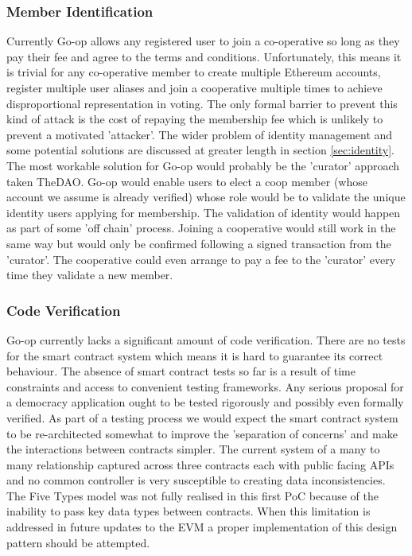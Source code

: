 \subsubsection{Member Identification}
Currently Go-op allows any registered user to join a co-operative so long as they pay their fee and agree to the terms and conditions. Unfortunately, this means it is trivial for any co-operative member to create multiple Ethereum accounts, register multiple user aliases and join a cooperative multiple times to achieve disproportional representation in voting. The only formal barrier to prevent this kind of attack is the cost of repaying the membership fee which is unlikely to prevent a motivated 'attacker'. The wider problem of identity management and some potential solutions are discussed at greater length in section \ref{sec:identity}. The most workable solution for Go-op would probably be the 'curator' approach taken TheDAO. Go-op would enable users to elect a coop member (whose account we assume is already verified) whose role would be to validate the unique identity users applying for membership. The validation of identity would happen as part of some 'off chain' process. Joining a cooperative would still work in the same way but would only be confirmed following a signed transaction from the 'curator'. The cooperative could even arrange to pay a fee to the 'curator' every time they validate a new member.\\

\subsubsection{Code Verification}
Go-op currently lacks a significant amount of code verification. There are no tests for the smart contract system which means it is hard to guarantee its correct behaviour. The absence of smart contract tests so far is a result of time constraints and access to convenient testing frameworks. Any serious proposal for a democracy application ought to be tested rigorously and possibly even formally verified. As part of a testing process we would expect the smart contract system to be re-architected somewhat to improve the 'separation of concerns' and make the interactions between contracts simpler. The current system of a many to many relationship captured across three contracts each with public facing APIs and no common controller is very susceptible to creating data inconsistencies. The Five Types model was not fully realised in this first PoC because of the inability to pass key data types between contracts. When this limitation is addressed in future updates to the EVM a proper implementation of this design pattern should be attempted.

